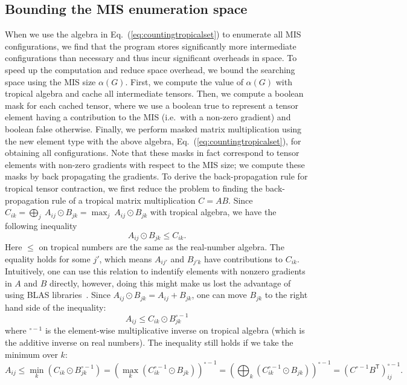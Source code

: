 \documentclass[onefignum, onetabnum]{siamart190516}
\newcommand{\<}{\langle}
\renewcommand{\>}{\rangle}
\newcommand{\Eq}[1]{Eq.~(\ref{#1})}
\begin{document}
\subsection{Bounding the MIS enumeration space}
When we use the algebra in \Eq{eq:countingtropicalset} to enumerate all MIS configurations, we find that the program stores significantly more intermediate configurations than necessary and thus incur significant overheads in space.
To speed up the computation and reduce space overhead, we bound the searching space using the MIS size $\alpha(G)$.
First, we compute the value of $\alpha(G)$ with tropical algebra and cache all intermediate tensors.
Then, we compute a boolean mask for each cached tensor, where we use a boolean true to represent a tensor element having a contribution to the MIS (i.e.\ with a non-zero gradient) and boolean false otherwise.
Finally, we perform masked matrix multiplication using the new element type with the above algebra, \Eq{eq:countingtropicalset}, for obtaining all configurations.
Note that these masks in fact correspond to tensor elements with non-zero gradients with respect to the MIS size; we compute these masks by back propagating the gradients.
To derive the back-propagation rule for tropical tensor contraction,
we first reduce the problem to finding the back-propagation rule of a tropical matrix multiplication $C = A B$.
Since $ C_{ik} = \bigoplus_{j} \ A_{ij} \odot B_{jk} = \max_{j} \ A_{ij} \odot B_{jk}$ with tropical algebra, we have the following inequality
\begin{equation}
    A_{ij} \odot B_{jk} \leq C_{ik}.
\end{equation}
Here $\leq$ on tropical numbers are the same as the real-number algebra.
The equality holds for some $j'$, which means $A_{ij'}$ and $B_{j'k}$ have contributions to $C_{ik}$.
Intuitively, one can use this relation to indentify elements with nonzero gradients in $A$ and $B$ directly,
however, doing this might make us lost the advantage of using BLAS libraries~\cite{TropicalGEMM}.
Since $A_{ij} \odot B_{jk} = A_{ij} + B_{jk}$, one can move $B_{jk}$ to the right hand side of the inequality: 
\begin{equation}
    A_{ij} \leq C_{ik} \odot B_{jk}^{\circ -1}
\end{equation}
where ${}^{\circ -1}$ is the element-wise multiplicative inverse on tropical algebra (which is the additive inverse on real numbers).
The inequality still holds if we take the minimum over $k$: 
\begin{equation}
    A_{ij} \leq \min_{k}(C_{ik} \odot B_{jk}^{\circ -1}) = \left(\max_{k} \left(C_{ik}^{\circ -1} \odot B_{jk} \right) \right)^{\circ -1} = \left(\bigoplus_{k} \left(C_{ik}^{\circ -1} \odot B_{jk} \right) \right)^{\circ -1} = \left( C^{\circ-1} B^{\mathsf{T}} \right)^{\circ -1}_{ij}.
\end{equation}
\end{document}
